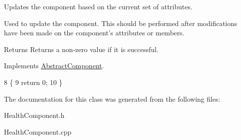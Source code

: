 Updates the component based on the current set of attributes. 

Used to update the component. This should be performed after modifications have been made on the component's attributes or members.

\begin{DoxyReturn}{Returns}
Returns a non-\/zero value if it is successful. 
\end{DoxyReturn}


Implements \hyperlink{class_abstract_component_a35c9cab4e3845a947609b6ada8dc89cf}{Abstract\-Component}.


\begin{DoxyCode}
8                             \{
9     \textcolor{keywordflow}{return} 0;
10 \}\end{DoxyCode}


The documentation for this class was generated from the following files\-:\begin{DoxyCompactItemize}
\item 
Health\-Component.\-h\item 
Health\-Component.\-cpp\end{DoxyCompactItemize}
